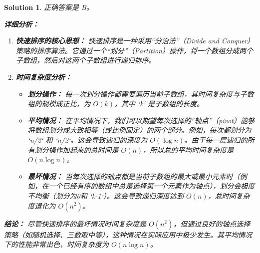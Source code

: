 \documentclass[UTF8]{report}
\newtheorem{solution}{Solution}
\theoremstyle{MyLineTheoremStyle} %
\theoremstyle{MyBlockTheoremStyle} %
\theoremstyle{MySubsubsectionStyle} %
\begin{document}
\begin{solution}
正确答案是 B。

\textbf{详细分析：}

\begin{enumerate}
    \item \textbf{快速排序的核心思想：}
    快速排序是一种采用“分治法”（Divide and Conquer）策略的排序算法。它通过一个“划分”（Partition）操作，将一个数组分成两个子数组，然后对这两个子数组进行递归排序。

    \item \textbf{时间复杂度分析：}
    \begin{itemize}
        \item \textbf{划分操作：} 每一次划分操作都需要遍历当前子数组，其时间复杂度与子数组的规模成正比，为 $O(k)$，其中 `k` 是子数组的长度。
        \item \textbf{平均情况：} 在平均情况下，我们可以期望每次选择的“轴点”（pivot）能够将数组划分成大致相等（或比例固定）的两个部分。例如，每次都划分为 `n/2` 和 `n/2`。这会导致递归的深度为 $O(\log n)$。由于每一层递归的所有划分操作加起来的总时间是 $O(n)$，所以总的平均时间复杂度是 $O(n \log n)$。
        \item \textbf{最坏情况：} 当每次选择的轴点都是当前子数组的最大或最小元素时（例如，在一个已经有序的数组中总是选择第一个元素作为轴点），划分会极度不均衡（划分为0和 `k-1`）。这会导致递归深度达到 $O(n)$，总时间复杂度退化为 $O(n^2)$。
    \end{itemize}
\end{enumerate}

\textbf{结论：}
尽管快速排序的最坏情况时间复杂度是 $O(n^2)$，但通过良好的轴点选择策略（如随机选择、三数取中等），这种情况在实际应用中极少发生。其平均情况下的性能非常出色，时间复杂度为 $O(n \log n)$。
\end{solution}
\end{document}
